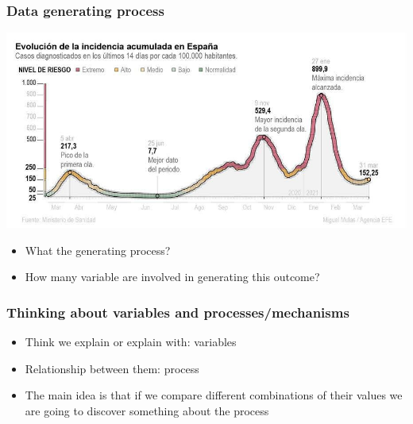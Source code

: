 \documentclass[aspectratio=43]{beamer}
\begin{document}
\begin{frame}
\frametitle{Data generating process}
\centering

\includegraphics[width = \textwidth]{../img/acumuladaincidencia31marzo}

\begin{itemize}[<+->]
  \item What the generating process?
  \item How many variable are involved in generating this outcome?
\end{itemize}

\end{frame}

\begin{frame}
\frametitle{Thinking about variables and processes/mechanisms}
\centering

\begin{itemize}
  \item Think we explain or explain with: variables
  \item Relationship between them: process
  \item The main idea is that if we compare different combinations of their values we are going to discover something about the process
\end{itemize}

\end{frame}
\end{document}
